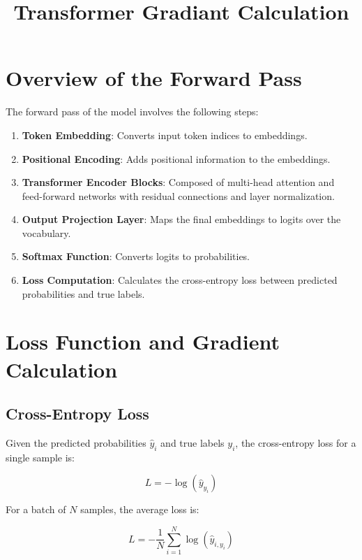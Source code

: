 \documentclass{article}
\title{Transformer Gradiant Calculation}
\begin{document}
\maketitle

\tableofcontents

\newpage

\section{Overview of the Forward Pass}

The forward pass of the model involves the following steps:

\begin{enumerate}
    \item \textbf{Token Embedding}: Converts input token indices to embeddings.
    \item \textbf{Positional Encoding}: Adds positional information to the embeddings.
    \item \textbf{Transformer Encoder Blocks}: Composed of multi-head attention and feed-forward networks with residual connections and layer normalization.
    \item \textbf{Output Projection Layer}: Maps the final embeddings to logits over the vocabulary.
    \item \textbf{Softmax Function}: Converts logits to probabilities.
    \item \textbf{Loss Computation}: Calculates the cross-entropy loss between predicted probabilities and true labels.
\end{enumerate}

\section{Loss Function and Gradient Calculation}

\subsection{Cross-Entropy Loss}

Given the predicted probabilities $\hat{y}_i$ and true labels $y_i$, the cross-entropy loss for a single sample is:

\begin{equation}
    L = -\log(\hat{y}_{y_i})
\end{equation}

For a batch of $N$ samples, the average loss is:

\begin{equation}
    L = -\frac{1}{N} \sum_{i=1}^{N} \log(\hat{y}_{i, y_i})
\end{equation}
\end{document}
